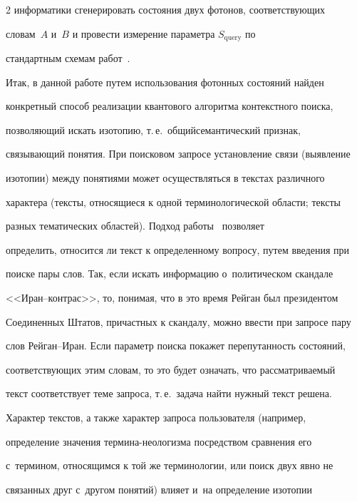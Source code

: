 \begin{multicols}{2}
информатики сгенерировать состояния двух фотонов, со\-от\-вет\-ст\-ву\-ющих 


словам~$A$ и~$B$ и провести измерение па\-ра\-мет\-ра $S_{\mathrm{query}}$ по 


стандартным схемам работ~\cite{9-an, 10-an, 11-an}. 


    


    Итак, в данной работе путем использования фотонных со\-сто\-яний найден 


конкретный способ реализации квантового алгоритма контекстного поиска, 


позволяющий искать изотопию, т.\,е.\ общий\linebreak семантический признак, 


свя\-зы\-ва\-ющий понятия. При поисковом запросе установление связи (выявление 


изотопии) меж\-ду понятиями может осуществляться в текстах различного 


характера (текс\-ты, относящиеся к одной терминологической об\-ласти; текс\-ты 


раз\-ных тематических областей). Подход работы~\cite{6-an} позволяет 


определить, относится ли текст к определенному вопросу, путем введения при 


поиске пары слов. Так, если искать информацию о~политическом скандале  


<<Иран--конт\-рас>>, то, понимая, что в это время Рейган был президентом 


Соединенных Штатов, причастных к скандалу, можно ввести при запросе пару 


слов Рей\-ган--Иран. Если параметр поиска покажет перепутанность со\-сто\-яний, 


соответствующих этим словам, то это будет означать, что рас\-смат\-ри\-ва\-емый 


текст соответствует теме запроса, т.\,е.\ задача найти нуж\-ный текст решена.


    


    Характер текстов, а также характер запроса пользователя (например, 


определение значения тер\-ми\-на-нео\-ло\-гиз\-ма посредством сравнения его 


с~термином, относящимся к той же терминологии, или поиск двух явно не 


связанных друг с~другом понятий) влияет и~на определение изотопии 



\end{multicols}
